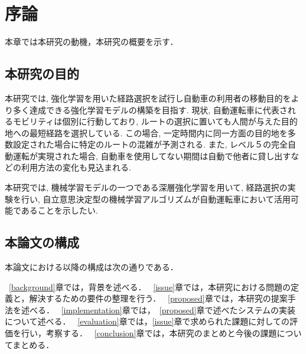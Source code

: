 \chapter{序論}
\label{introduction}

本章では本研究の動機，本研究の概要を示す．

\section{本研究の目的}

本研究では, 強化学習を用いた経路選択を試行し自動車の利用者の移動目的をより多く達成できる強化学習モデルの構築を目指す.
現状, 自動運転車に代表されるモビリティは個別に行動しており, ルートの選択に置いても人間が与えた目的地への最短経路を選択している.
この場合, 一定時間内に同一方面の目的地を多数設定された場合に特定のルートの混雑が予測される. 
また, レベル５の完全自動運転が実現された場合, 自動車を使用してない期間は自動で他者に貸し出すなどの利用方法の変化も見込まれる.

本研究では, 機械学習モデルの一つである深層強化学習を用いて, 経路選択の実験を行い, 自立意思決定型の機械学習アルゴリズムが自動運転車において活用可能であることを示したい.




\section{本論文の構成}

本論文における以降の構成は次の通りである．

~\ref{background}章では，背景を述べる．
~\ref{issue}章では，本研究における問題の定義と，解決するための要件の整理を行う．
~\ref{proposed}章では，本研究の提案手法を述べる．
~\ref{implementation}章では，~\ref{proposed}章で述べたシステムの実装について述べる．
~\ref{evaluation}章では，\ref{issue}章で求められた課題に対しての評価を行い，考察する．
~\ref{conclusion}章では，本研究のまとめと今後の課題についてまとめる．


